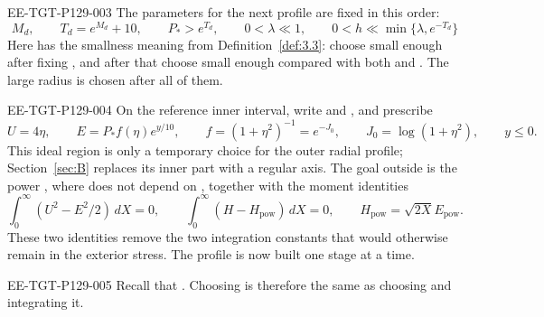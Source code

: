 \begin{EESegment}{EE-TGT-P129-003}
The parameters for the next profile are fixed in this order:
\begin{equation}
M_d,
\qquad T_d=e^{M_d}+10,
\qquad P_*>e^{T_d},
\qquad 0<\lambda\ll1,
\qquad 0<h\ll\min\{\lambda,e^{-T_d}\}
\tag{A.6}\label{eq:A.6}
\end{equation}
Here  has the smallness meaning from
Definition~\ref{def:3.3}: choose  small enough after
fixing , and after that choose
 small enough compared with both
 and . The large radius
 is chosen after all of them.
\end{EESegment}

\begin{EESegment}{EE-TGT-P129-004}
On the reference inner interval, write  and
, and prescribe
\begin{equation}
U=4\eta,
\qquad E=P_*f(\eta)e^{y/10},
\qquad f=(1+\eta^2)^{-1}=e^{-J_0},
\qquad J_0=\log(1+\eta^2),
\qquad y\le0.
\tag{A.7}\label{eq:A.7}
\end{equation}
This ideal region is only a temporary choice for the outer radial profile; Section~\ref{sec:B}
replaces its inner part with a regular axis. The goal outside is the power
, where
 does not depend on
, together with the moment identities
\begin{equation}
\int_0^\infty(U^2-E^2/2)\,dX=0,
\qquad
\int_0^\infty(H-H_{\mathrm{pow}})\,dX=0,
\qquad
H_{\mathrm{pow}}=\sqrt{2X}E_{\mathrm{pow}}.
\tag{A.8}\label{eq:A.8}
\end{equation}
These two identities remove the two integration constants that would otherwise remain in
the exterior stress. The profile is now built one stage at a time.
\end{EESegment}

\begin{EESegment}{EE-TGT-P129-005}
Recall that . Choosing
 is therefore the same as choosing
 and integrating it.
\end{EESegment}

